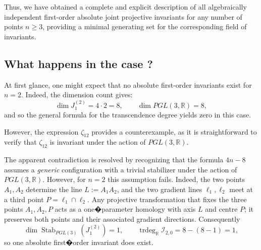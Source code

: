 \documentclass[12pt,reqno]{amsart}
\begin{document}
Thus, we have obtained a complete and explicit description of all algebraically independent first-order absolute joint projective invariants for any number of points \( n \geq 3 \), providing a minimal generating set for the corresponding field of invariants.



\subsection{What happens in the case ?}

At first glance, one might expect that no absolute first-order invariants exist for $n=2$. Indeed, the dimension count gives:
\[
\dim J^{(2)}_1 = 4 \cdot 2 = 8, \qquad \dim PGL(3,\mathbb{R}) = 8,
\]
and so the general formula for the transcendence degree
yields zero in this case.

However, the expression
$
\zeta_{12}
$
provides a counterexample, as it is straightforward to verify that $\zeta_{12}$ is invariant under the action of $PGL(3,\mathbb{R})$.


The apparent contradiction is resolved by recognizing that the formula $4n - 8$ assumes a \emph{generic} configuration with a trivial stabilizer under the action of $PGL(3,\mathbb{R})$. However, for $n=2$ this assumption fails.
Indeed, the two points $A_1,A_2$ determine the line $L:=A_1A_2$, and the two gradient lines $\ell_1,\ell_2$ meet at a third point $P=\ell_1\cap\ell_2$.
Any projective transformation that fixes the three points $A_1,A_2,P$ acts as a one�parameter homology with axis $L$ and centre $P$; it preserves both points and their associated gradient directions.
Consequently
\[
\dim\operatorname{Stab}_{PGL(3)}(J^{(2)}_1)=1,
\qquad
\operatorname{trdeg}_{\mathbb R}\mathcal I_{2,0}=8-(8-1)=1,
\]
so one absolute first�order invariant does exist.
\end{document}
